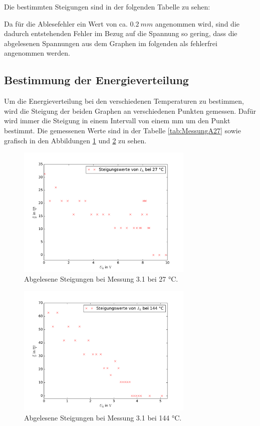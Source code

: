 

Die bestimmten Steigungen sind in der folgenden Tabelle zu sehen:



Da für die Ablesefehler ein Wert von ca. $\SI{0.2}{mm}$ angenommen wird, sind
die dadurch entstehenden Fehler im Bezug auf die Spannung so gering, dass die
abgelesenen Spannungen aus dem Graphen im folgenden als fehlerfrei angenommen werden.


\subsection{Bestimmung der Energieverteilung}

Um die Energieverteilung bei den verschiedenen Temperaturen zu bestimmen, wird
die Steigung der beiden Graphen an verschiedenen Punkten gemessen. Dafür wird immer
die Steigung in einem Intervall von einem mm um den Punkt bestimmt. Die gemessenen
Werte sind in der Tabelle \ref{tab:MessungA27} sowie grafisch in den Abbildungen
\ref{fig:Messung_A_27} und \ref{fig:Messung_A_144} zu sehen.



\begin{figure}
  \centering
  \includegraphics[width = 0.75\textwidth]{Pics/Messung_A_27.pdf}
  \caption{Abgelesene Steigungen bei Messung 3.1 bei 27 °C.}
  \label{fig:Messung_A_27}
\end{figure}

\begin{figure}
  \centering
  \includegraphics[width = 0.75\textwidth]{Pics/Messung_A_144.pdf}
  \caption{Abgelesene Steigungen bei Messung 3.1 bei 144 °C.}
  \label{fig:Messung_A_144}
\end{figure}

